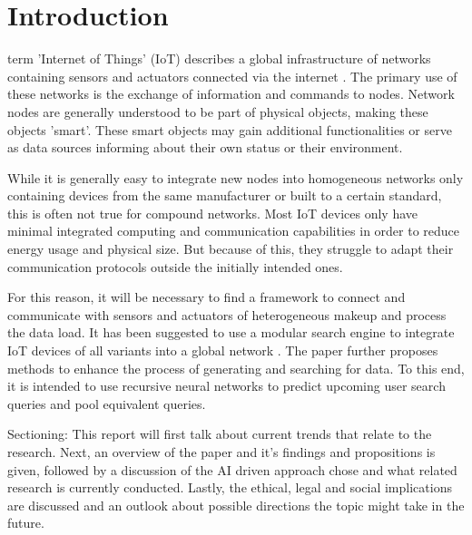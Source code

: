 \documentclass [journal]{IEEEtran}
\begin{document}
 \section{Introduction}
 term 'Internet of Things' (IoT) describes a global infrastructure of networks containing sensors and actuators connected via the internet \cite{IoTdefinition}. The primary use of these networks is the exchange of information and commands to nodes. Network nodes are generally understood to be part of physical objects, making these objects 'smart'. These smart objects may gain additional functionalities or serve as data sources informing about their own status or their environment. \par
While it is generally easy to integrate new nodes into homogeneous networks only containing devices from the same manufacturer or built to a certain standard, this is often not true for compound networks. Most IoT devices only have minimal integrated computing and communication capabilities in order to reduce energy usage and physical size. But because of this, they struggle to adapt their communication protocols outside the initially intended ones. \par
For this reason, it will be necessary to find a framework to connect and communicate with sensors and actuators of heterogeneous makeup and process the data load. It has been suggested to use a modular search engine to integrate IoT devices of all variants into a global network \cite{main}. The paper further proposes methods to enhance the process of generating and searching for data. To this end, it is intended to use recursive neural networks to predict upcoming user search queries and pool equivalent queries. \par
 \vspace{5mm}
Sectioning: This report will first talk about current trends that relate to the research. Next, an overview of the paper and it's findings and propositions is given, followed by a discussion of the AI driven approach \cite{main} chose and what related research is currently conducted. Lastly, the ethical, legal and social implications are discussed and an outlook about possible directions the topic might take in the future.
\end{document}
